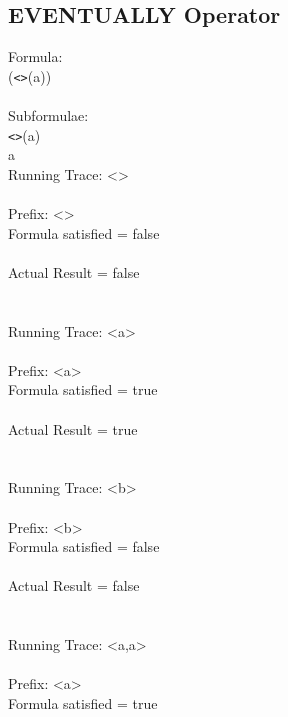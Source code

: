 \subsection{EVENTUALLY Operator}

Formula:\\
(\texttt{\textless \textgreater}(a))\\
\\
Subformulae:\\
\texttt{\textless \textgreater}(a)\\
a\\

\noindent Running Trace: \textless \textgreater\\
\\
  Prefix: \textless \textgreater\\
  Formula satisfied = false\\
\\
  Actual Result = false\\
\\
\\
Running Trace: \textless a\textgreater\\
\\
  Prefix: \textless a\textgreater\\
  Formula satisfied = true\\
\\
  Actual Result = true\\
\\
\\
Running Trace: \textless b\textgreater\\
\\
  Prefix: \textless b\textgreater\\
  Formula satisfied = false\\
\\
  Actual Result = false\\
\\
\\
Running Trace: \textless a,a\textgreater\\
\\
  Prefix: \textless a\textgreater\\
  Formula satisfied = true\\
\\
\newpage


